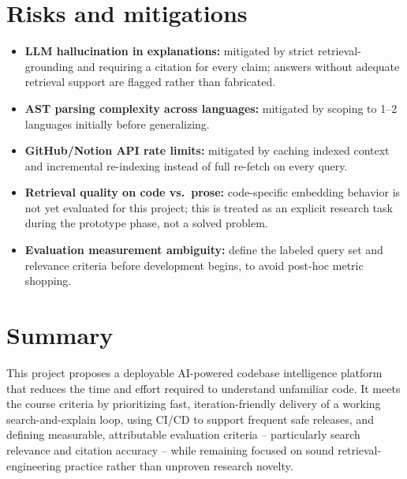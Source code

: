 \documentclass[11pt,a4paper]{article}
\begin{document}
\section{Risks and mitigations}
\begin{itemize}[leftmargin=0.7cm]
    \item \textbf{LLM hallucination in explanations:} mitigated by strict retrieval-grounding and requiring a citation for every claim; answers without adequate retrieval support are flagged rather than fabricated.
    \item \textbf{AST parsing complexity across languages:} mitigated by scoping to 1--2 languages initially before generalizing.
    \item \textbf{GitHub/Notion API rate limits:} mitigated by caching indexed context and incremental re-indexing instead of full re-fetch on every query.
    \item \textbf{Retrieval quality on code vs.\ prose:} code-specific embedding behavior is not yet evaluated for this project; this is treated as an explicit research task during the prototype phase, not a solved problem.
    \item \textbf{Evaluation measurement ambiguity:} define the labeled query set and relevance criteria before development begins, to avoid post-hoc metric shopping.
\end{itemize}

\section{Summary}
This project proposes a deployable AI-powered codebase
intelligence platform that reduces the time and effort
required to understand unfamiliar code. It meets the
course criteria by prioritizing fast, iteration-friendly
delivery of a working search-and-explain loop, using
CI/CD to support frequent safe releases, and defining
measurable, attributable evaluation criteria --
particularly search relevance and citation accuracy --
while remaining focused on sound retrieval-engineering
practice rather than unproven research novelty.
\end{document}
